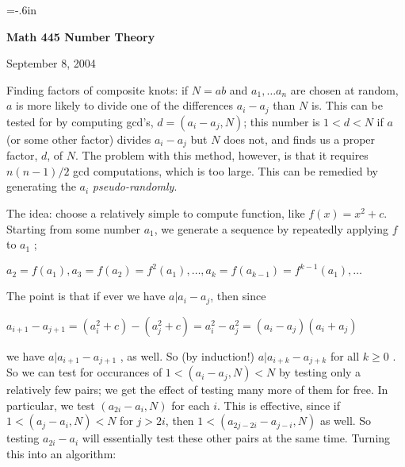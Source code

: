 




\nopagenumbers
\parindent=-20pt
\voffset=-.6in


\def\ctln{\centerline}
\def\u{\underbar}
\def\ssk{\smallskip}
\def\msk{\medskip}
\def\bsk{\bigskip}


\ctln{\bf Math 445 Number Theory}

\medskip

\ctln{September 8, 2004}

\bigskip

Finding factors of composite knots:  if $N=ab$ and $a_1,\ldots a_n$ 
are chosen at random, $a$ is more 
likely to divide  one of the differences $a_i-a_j$ than $N$
is. This can be tested for by computing gcd's, $d=(a_i-a_j,N)$; this number 
is $1<d<N$ if $a$ (or some other
factor) divides $a_i-a_j$ but $N$ does not, and finds us a proper factor, 
$d$, of $N$.  The problem with this method,
however, is that it requires $n(n-1)/2$  gcd computations, which is too large. 
This can be remedied by generating the $a_i$ {\it pseudo-randomly}.

\msk

The idea: choose a relatively simple to compute function, like $f(x)=x^2+c$. 
Starting from some number
$a_1$, we generate a sequence by repeatedly applying $f$ to 
$a_1$ ; 

\ssk

\ctln{$a_2=f(a_1), a_3=f(a_2)=f^2(a_1),\ldots ,a_k=f(a_{k-1})=f^{k-1}(a_1),\ldots$}

\ssk

\noindent The point is that if ever we have $a|a_i-a_j$, then since 

\ssk

\ctln{$a_{i+1}-a_{j+1} = (a_i^2+c)-(a_j^2+c) = a_i^2-a_j^2 = (a_i-a_j)(a_i+a_j)$}

\ssk

\noindent we have $a|a_{i+1}-a_{j+1}$ , as well. So (by induction!) 
$a|a_{i+k}-a_{j+k}$ for all $k\geq 0$ . So we can 
test for occurances of $1<(a_i-a_j,N)<N$ by testing only a relatively few pairs; 
we get the effect of testing many more of them for free. 
In particular, we test $(a_{2i}-a_i,N)$ for each $i$. This is effective, 
since if $1<(a_j-a_i,N)<N$ for $j>2i$, then $1<(a_{2j-2i}-a_{j-i},N)$ 
as well. So testing $a_{2i}-a_i$ will essentially test these other
pairs at the same time. Turning this into an algorithm:

\bsk


